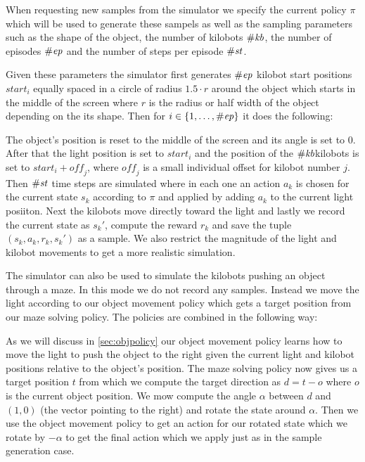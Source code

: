 \documentclass[twoside]{article}
\begin{document}
When requesting new samples from the simulator we specify the current policy
$\pi$ which will be used to generate these sampels as well as the sampling
parameters such as the shape of the object, the number of kilobots $\#\mathit{kb}$, the
number of episodes $\#\mathit{ep}$ and the number of steps per episode $\#\mathit{st}$.

Given these parameters the simulator first generates $\#\mathit{ep}$ kilobot start
positions $\mathit{start}_i$ equally spaced in a circle of radius $1.5 \cdot r$
around the object which starts in the middle of the screen where $r$ is the
radius or half width of the object depending on the its shape. Then for
$i \in \{1, \dots, \#\mathit{ep}\}$ it does the following:

The object's position is reset to the middle of the screen and its angle is set
to 0. After that the light position is set to $\mathit{start}_i$ and the
position of the $\#\mathit{kb} $kilobots is set to $\mathit{start}_i + \mathit{off}_j$,
where $\mathit{off}_j$ is a small individual offset for kilobot number $j$.
Then $\#\mathit{st}$ time steps are simulated where in each one an action $a_k$ is chosen
for the current state $s_k$ according to $\pi$ and applied by adding $a_k$ to
the current light posiiton. Next the kilobots move directly toward the light and
lastly we record the current state as $s_k'$, compute the reward $r_k$ and
save the tuple $(s_k, a_k, r_k, s_k')$ as a sample. We also restrict the
magnitude of the light and kilobot movements to get a more realistic simulation.

The simulator can also be used to simulate the kilobots pushing an object
through a maze. In this mode we do not record any samples. Instead we move the
light according to our object movement policy which gets a target position from
our maze solving policy. The policies are combined in the following way:

As we will discuss in \autoref{sec:objpolicy} our object movement policy learns
how to move the light to push the object to the right given the current light
and kilobot positions relative to the object's position. The maze solving policy
now gives us a target position $t$ from which we compute the target direction as
$d = t - o$ where $o$ is the current object position. We mow compute the angle
$\alpha$ between $d$ and $(1, 0)$ (the vector pointing to the right) and rotate
the state around $\alpha$. Then we use the object movement policy to get an
action for our rotated state which we rotate by $-\alpha$ to get the final
action which we apply just as in the sample generation case.
\end{document}
